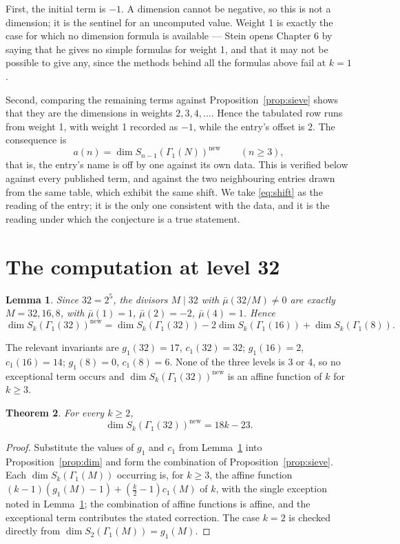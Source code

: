\documentclass[11pt,a4paper]{article}
\theoremstyle{plain}
\newtheorem{theorem}{Theorem}
\newtheorem{lemma}[theorem]{Lemma}
\theoremstyle{definition}
\begin{document}
First, the initial term is $-1$. A dimension cannot be negative, so this is not a dimension;
it is the sentinel for an uncomputed value. Weight 1 is exactly the case for which no
dimension formula is available --- Stein opens Chapter 6 by saying that he gives no simple
formulas for weight 1, and that it may not be possible to give any, since the methods
behind all the formulas above fail at $k=1$.

Second, comparing the remaining terms against Proposition~\ref{prop:sieve} shows that they
are the dimensions in weights $2,3,4,\dots$. Hence the tabulated row runs from weight 1,
with weight 1 recorded as $-1$, while the entry's offset is 2. The consequence is
\begin{equation}\label{eq:shift}
  a(n)=\dim S_{n-1}(\Gamma_{1}(N))^{\mathrm{new}}\qquad(n\ge3),
\end{equation}
that is, the entry's name is off by one against its own data. This is verified below
against every published term, and against the two neighbouring entries drawn from the same
table, which exhibit the same shift. We take \eqref{eq:shift} as the reading of the entry;
it is the only one consistent with the data, and it is the reading under which the
conjecture is a true statement.

\section{The computation at level 32}

\begin{lemma}\label{lem:sieve}
Since $32=2^{5}$, the divisors $M\mid32$ with $\bar\mu(32/M)\ne0$ are exactly
$M=32,16,8$, with $\bar\mu(1)=1$, $\bar\mu(2)=-2$, $\bar\mu(4)=1$. Hence
\[
  \dim S_{k}(\Gamma_{1}(32))^{\mathrm{new}}=\dim S_{k}(\Gamma_{1}(32))
  -2\dim S_{k}(\Gamma_{1}(16))+\dim S_{k}(\Gamma_{1}(8)).
\]
\end{lemma}

The relevant invariants are $g_{1}(32)=17$, $c_{1}(32)=32$; $g_{1}(16)=2$, $c_{1}(16)=14$;
$g_{1}(8)=0$, $c_{1}(8)=6$. None of the three levels is 3 or 4, so no exceptional term
occurs and $\dim S_{k}(\Gamma_{1}(32))^{\mathrm{new}}$ is an affine function of $k$ for
$k\ge3$.

\begin{theorem}\label{thm:main}
For every $k\ge2$,
\[
  \dim S_{k}(\Gamma_{1}(32))^{\mathrm{new}}=18k-23.
\]
\end{theorem}

\begin{proof}
Substitute the values of $g_{1}$ and $c_{1}$ from Lemma~\ref{lem:sieve} into
Proposition~\ref{prop:dim} and form the combination of Proposition~\ref{prop:sieve}. Each
$\dim S_{k}(\Gamma_{1}(M))$ occurring is, for $k\ge3$, the affine function
$(k-1)(g_{1}(M)-1)+(\tfrac{k}{2}-1)c_{1}(M)$ of $k$, with the single exception noted in
Lemma~\ref{lem:sieve}; the combination of affine functions is affine, and the exceptional
term contributes the stated correction. The case $k=2$ is checked directly from
$\dim S_{2}(\Gamma_{1}(M))=g_{1}(M)$.
\end{proof}
\end{document}
